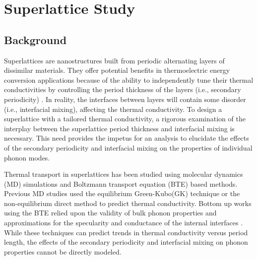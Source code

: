 \chapter{Superlattice Study}\label{CHP:SL}

\section{Background}

Superlattices are nanostructures built from periodic alternating layers of dissimilar materials. They offer potential benefits in thermoelectric energy conversion applications because of the ability to independently tune their thermal conductivities by controlling the period thickness of the layers (i.e., secondary periodicity) \cite{broido1995effect,balandin2003mechanism,kim2006thermal}. In reality, the interfaces between layers will contain some disorder (i.e., interfacial mixing), affecting the thermal conductivity. To design a superlattice with a tailored thermal conductivity, a rigorous examination of the interplay between the superlattice period thickness and interfacial mixing is necessary. This need provides the impetus for an analysis to elucidate the effects of the secondary periodicity and interfacial mixing on the properties of individual phonon modes. 

Thermal transport in superlattices has been studied using molecular dynamics (MD) simulations and Boltzmann transport equation (BTE) based methods. Previous MD studies used the equilibrium Green-Kubo(GK) \cite{PhysRevB.85.195302,PhysRevB.77.184302} technique or the non-equilibrium direct method \cite{PhysRevB.79.214307,PhysRevB.72.174302,PhysRevB.79.075316} to predict thermal conductivity. Bottom up works using the BTE relied upon the validity of bulk phonon properties \cite{walkauskas:2579,chen:220} and approximations for the specularity and conductance of the internal interfaces \cite{PhysRevB.57.14958}. While these techniques can predict trends in thermal conductivity versus period length, the effects of the secondary periodicity and interfacial mixing on phonon properties cannot be directly modeled.

